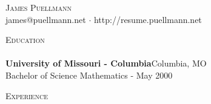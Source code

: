 \documentclass[letterpaper]{article}
\newcommand{\lineunder} {
    \vspace*{-8pt} \\
    \hspace*{-18pt} \hrulefill \\
}
\newcommand{\header} [1] {
    {\hspace*{-18pt}\vspace*{6pt} \textsc{#1}}
    \vspace*{-6pt} \lineunder
}
\begin{document}
\vspace*{-40pt}

    

\vspace*{-10pt}
\begin{center}
	{\Huge \scshape {James Puellmann}}\\
	james@puellmann.net $\cdot$ http://resume.puellmann.net\\
\end{center}

\header{Education}
\textbf{University of Missouri - Columbia}\hfill Columbia, MO\\
Bachelor of Science Mathematics \hfill  - May 2000\\
\vspace{2mm}

\header{Experience}
\vspace{1mm}
\end{document}
